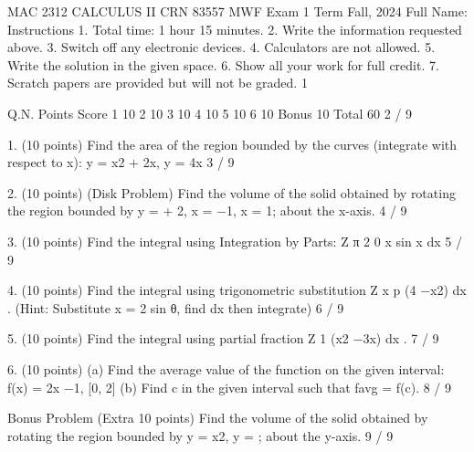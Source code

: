 MAC 2312 CALCULUS II CRN 83557 MWF
Exam 1
Term Fall, 2024
Full Name:
Instructions
1. Total time: 1 hour 15 minutes.
2. Write the information requested above.
3. Switch off any electronic devices.
4. Calculators are not allowed.
5. Write the solution in the given space.
6. Show all your work for full credit.
7. Scratch papers are provided but will not be graded.
1

Q.N.
Points
Score
1
10
2
10
3
10
4
10
5
10
6
10
Bonus
10
Total
60
2 / 9

1. (10 points) Find the area of the region bounded by the curves (integrate with respect to x):
y = x2 + 2x,
y = 4x
3 / 9

2. (10 points) (Disk Problem) Find the volume of the solid obtained by rotating the region bounded by
y =
 + 2, x = −1, x = 1;
about the x-axis.
4 / 9

3. (10 points) Find the integral using Integration by Parts:
Z
π
2
0
x sin x dx
5 / 9

4. (10 points) Find the integral using trigonometric substitution
Z
x
p
(4 −x2) dx .
(Hint: Substitute x = 2 sin θ, find dx then integrate)
6 / 9

5. (10 points) Find the integral using partial fraction
Z
1
(x2 −3x) dx .
7 / 9

6. (10 points)
(a) Find the average value of the function on the given interval: f(x) = 2x −1,
[0, 2]
(b) Find c in the given interval such that favg = f(c).
8 / 9

Bonus Problem (Extra 10 points) Find the volume of the solid obtained by rotating the region bounded
by
y = x2, y =  ;
about the y-axis.
9 / 9

